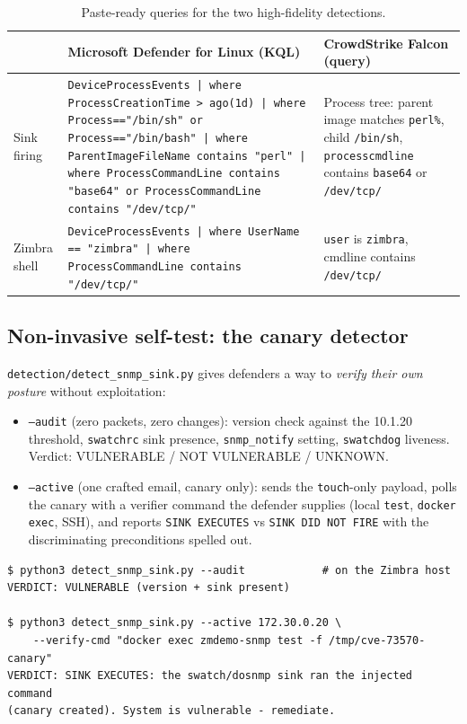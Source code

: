 \documentclass[journal]{IEEEtran}
\begin{document}
\begin{table}[t]
\centering
\footnotesize
\begin{tabular}{p{4.2cm}p{7.2cm}p{4.2cm}}
\toprule
 & Microsoft Defender for Linux (KQL) & CrowdStrike Falcon (query) \\
\midrule
Sink firing &
  \texttt{DeviceProcessEvents | where ProcessCreationTime > ago(1d) | where
  Process=="/bin/sh" or Process=="/bin/bash" | where ParentImageFileName
  contains "perl" | where ProcessCommandLine contains "base64" or
  ProcessCommandLine contains "/dev/tcp/"} &
  Process tree: parent image matches \texttt{perl\%}, child
  \texttt{/bin/sh}, \texttt{processcmdline} contains \texttt{base64}
  or \texttt{/dev/tcp/} \\
Zimbra shell &
  \texttt{DeviceProcessEvents | where UserName == "zimbra" | where
  ProcessCommandLine contains "/dev/tcp/"} &
  \texttt{user} is \texttt{zimbra}, cmdline contains \texttt{/dev/tcp/} \\
\bottomrule
\end{tabular}
\caption{Paste-ready queries for the two high-fidelity detections.}
\label{tab:edr}
\end{table}

\subsection{Non-invasive self-test: the canary detector}

\texttt{detection/detect\_snmp\_sink.py} gives defenders a way to
\emph{verify their own posture} without exploitation:
\begin{itemize}
\item \texttt{--audit} (zero packets, zero changes): version check against
      the 10.1.20 threshold, \texttt{swatchrc} sink presence,
      \texttt{snmp\_notify} setting, \texttt{swatchdog} liveness. Verdict:
      VULNERABLE / NOT VULNERABLE / UNKNOWN.
\item \texttt{--active} (one crafted email, canary only): sends the
      \texttt{touch}-only payload, polls the canary with a verifier command
      the defender supplies (local \texttt{test}, \texttt{docker exec},
      SSH), and reports \texttt{SINK EXECUTES} vs \texttt{SINK DID NOT
      FIRE} with the discriminating preconditions spelled out.
\end{itemize}

\begin{lstlisting}[style=shell,caption={Detector output on the stock lab (real run)}]
$ python3 detect_snmp_sink.py --audit            # on the Zimbra host
VERDICT: VULNERABLE (version + sink present)

$ python3 detect_snmp_sink.py --active 172.30.0.20 \
    --verify-cmd "docker exec zmdemo-snmp test -f /tmp/cve-73570-canary"
VERDICT: SINK EXECUTES: the swatch/dosnmp sink ran the injected command
(canary created). System is vulnerable - remediate.
\end{lstlisting}
\end{document}
